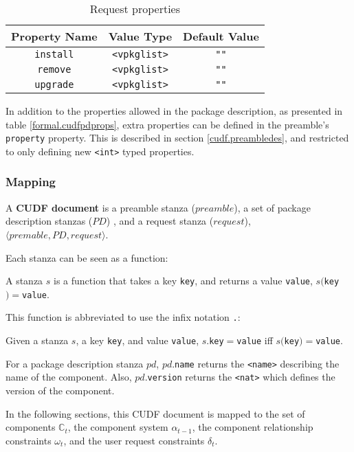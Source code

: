 \begin{table}
\begin{tabular}{|c|c|c|}
Property Name & Value Type & Default Value \\ \hline
\texttt{install} & \verb+<vpkglist>+ & \verb+""+ \\ 
\texttt{remove} & \verb+<vpkglist>+ & \verb+""+ \\ 
\texttt{upgrade} & \verb+<vpkglist>+ & \verb+""+ \\ 
\end{tabular}
\caption{Request properties}
\label{formal.cudfrequestprops}
\end{table}

In addition to the properties allowed in the package description, as presented in table \ref{formal.cudfpdprops}, extra properties can be defined in the preamble's \texttt{property} property.
This is described in section \ref{cudf.preambledes}, and restricted to only defining new \texttt{<int>} typed properties.

\subsubsection{Mapping}

\begin{defs}
A \textbf{CUDF document} is a preamble stanza ($preamble$), a set of package description stanzas ($PD$) , and a request stanza ($request$), $\langle premable, PD, request \rangle$.
\end{defs}

Each stanza can be seen as a function:
\begin{defs}
A stanza $s$ is a function that takes a key \texttt{key}, and returns a value \texttt{value}, $s($\texttt{key}$) = $\texttt{value}. 
\end{defs}

This function is abbreviated to use the infix notation \texttt{.}:
\begin{defs}
Given a stanza $s$, a key \texttt{key}, and value \texttt{value}, $s$.\texttt{key}$ = $\texttt{value} iff $s($\texttt{key}$) = $\texttt{value}.
\end{defs}
For a package description stanza $pd$, $pd$.\texttt{name} returns the \texttt{<name>} describing the name of the component.
Also, $pd$.\texttt{version} returns the \texttt{<nat>} which defines the version of the component.

In the following sections, this CUDF document is mapped to the set of components $\mathbb{C}_t$, the component system $\alpha_{t-1}$,
the component relationship constraints $\omega_t$, and the user request constraints $\delta_t$.

